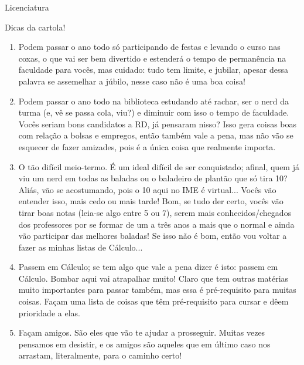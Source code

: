 \begin{subsecao}{Licenciatura}
\begin{subsubsecao}{Dicas da cartola!}
\begin{enumerate}
\item Podem passar o ano todo só participando de festas e levando o curso nas
  coxas, o que vai ser bem divertido e estenderá o tempo de permanência na
  faculdade para vocês, mas cuidado: tudo tem limite, e jubilar, apesar dessa
  palavra se assemelhar a júbilo, nesse caso não é uma boa coisa!
\item Podem passar o ano todo na biblioteca estudando até rachar, ser o nerd da
  turma (e, vê se passa cola, viu?) e diminuir com isso o tempo de faculdade.
  Vocês seriam bons candidatos a RD, já pensaram nisso? Isso gera coisas boas
  com relação a bolsas e empregos, então também vale a pena, mas não vão se
  esquecer de fazer amizades, pois é a única coisa que realmente importa.
\item O tão difícil meio-termo. É um ideal difícil de ser conquistado; afinal,
  quem já viu um nerd em todas as baladas ou o baladeiro de plantão que só tira
  10? Aliás, vão se acostumando, pois o 10 aqui no IME é virtual... Vocês vão
  entender isso, mais cedo ou mais tarde! Bom, se tudo der certo, vocês vão
  tirar boas notas (leia-se algo entre 5 ou 7), serem mais conhecidos/chegados
  dos professores por se formar de um a três anos a mais que o normal e ainda
  vão participar das melhores baladas! Se isso não é bom, então vou voltar a
  fazer as minhas listas de Cálculo...
\item Passem em Cálculo; se tem algo que vale a pena dizer é isto: passem em
  Cálculo. Bombar aqui vai atrapalhar muito! Claro que tem outras matérias muito
  importantes para passar também, mas essa é pré-requisito para muitas coisas.
  Façam uma lista de coisas que têm pré-requisito para cursar e dêem prioridade
  a elas.
\item Façam amigos. São eles que vão te ajudar a prosseguir. Muitas vezes
  pensamos em desistir, e os amigos são aqueles que em último caso nos arrastam,
  literalmente, para o caminho certo!

\end{enumerate}

\end{subsubsecao}
\pagebreak
{}

\end{subsecao}
